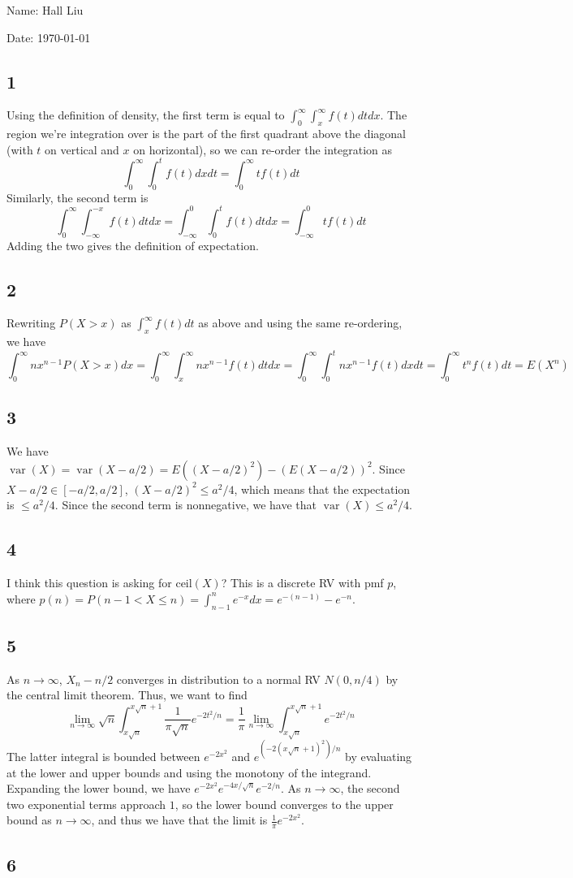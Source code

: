 \documentclass{article}
\DeclareMathOperator{\var}{var}
\begin{document}
Name: Hall Liu

Date: \today 
\vspace{1.5cm}

\subsection*{1}
Using the definition of density, the first term is equal to $\int_0^\infty\int_x^\infty f(t)dtdx$. The region we're integration over is the part of the first quadrant above the diagonal (with $t$ on vertical and $x$ on horizontal), so we can re-order the integration as
$$\int_0^\infty\int_0^tf(t)dxdt=\int_0^\infty tf(t)dt$$
Similarly, the second term is 
$$\int_0^\infty\int_{-\infty}^{-x}f(t)dtdx=\int_{-\infty}^0\int_0^tf(t)dtdx=\int_{-\infty}^0tf(t)dt$$
Adding the two gives the definition of expectation.
\subsection*{2}
Rewriting $P(X>x)$ as $\int_x^\infty f(t)dt$ as above and using the same re-ordering, we have
$$\int_0^\infty nx^{n-1}P(X>x)dx=\int_0^\infty\int_x^\infty nx^{n-1}f(t)dtdx=\int_0^\infty\int_0^tnx^{n-1}f(t)dxdt=\int_0^\infty t^nf(t)dt=E(X^n)$$
\subsection*{3}
We have $\var(X)=\var(X-a/2)=E((X-a/2)^2)-(E(X-a/2))^2$. Since $X-a/2\in[-a/2,a/2]$, $(X-a/2)^2\leq a^2/4$, which means that the expectation is $\leq a^2/4$. Since the second term is nonnegative, we have that $\var(X)\leq a^2/4$.
\subsection*{4}
I think this question is asking for $\text{ceil}(X)$? This is a discrete RV with pmf $p$, where $p(n)=P(n-1<X\leq n)=\int_{n-1}^ne^{-x}dx=e^{-(n-1)}-e^{-n}$.
\subsection*{5}
As $n\to\infty$, $X_n-n/2$ converges in distribution to a normal RV $N(0,n/4)$ by the central limit theorem. Thus, we want to find 
$$\lim_{n\to\infty}\sqrt{n}\int_{x\sqrt{n}}^{x\sqrt{n}+1}\frac{1}{\pi\sqrt{n}}e^{-2t^2/n}=\frac{1}{\pi}\lim_{n\to\infty}\int_{x\sqrt{n}}^{x\sqrt{n}+1}e^{-2t^2/n}$$
The latter integral is bounded between $e^{-2x^2}$ and $e^{(-2(x\sqrt{n}+1)^2)/n}$ by evaluating at the lower and upper bounds and using the monotony of the integrand. Expanding the lower bound, we have $e^{-2x^2}e^{-4x/\sqrt{n}}e^{-2/n}$. As $n\to\infty$, the second two exponential terms approach $1$, so the lower bound converges to the upper bound as $n\to\infty$, and thus we have that the limit is $\frac{1}{\pi}e^{-2x^2}$.
\subsection*{6}
\end{document}
